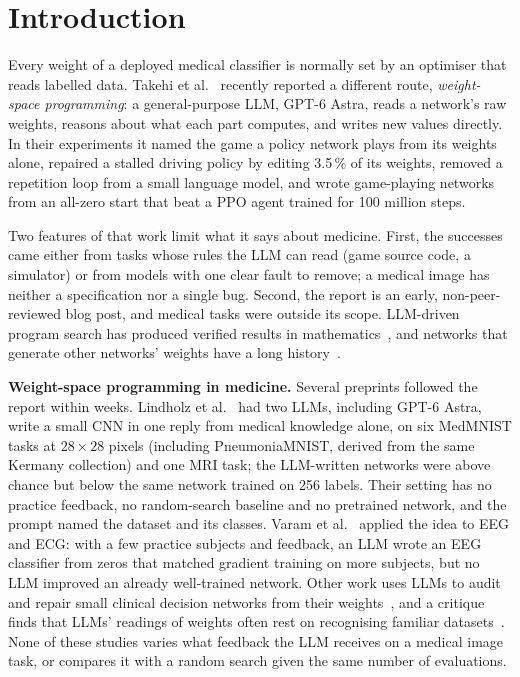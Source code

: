 \documentclass[runningheads]{llncs}
\newcommand{\Astra}{GPT-6 Astra}
\begin{document}
\section{Introduction}
Every weight of a deployed medical classifier is normally set by an optimiser that reads labelled data.
Takehi et al.~\cite{takehi2026} recently reported a different route, \emph{weight-space programming}: a general-purpose LLM, \Astra, reads a network's raw weights, reasons about what each part computes, and writes new values directly.
In their experiments it named the game a policy network plays from its weights alone, repaired a stalled driving policy by editing 3.5\,\% of its weights, removed a repetition loop from a small language model, and wrote game-playing networks from an all-zero start that beat a PPO agent trained for 100 million steps.

Two features of that work limit what it says about medicine.
First, the successes came either from tasks whose rules the LLM can read (game source code, a simulator) or from models with one clear fault to remove; a medical image has neither a specification nor a single bug.
Second, the report is an early, non-peer-reviewed blog post, and medical tasks were outside its scope.
LLM-driven program search has produced verified results in mathematics~\cite{romeraparedes2024}, and networks that generate other networks' weights have a long history~\cite{ha2017}.

\noindent\textbf{Weight-space programming in medicine.}
Several preprints followed the report within weeks.
Lindholz et al.~\cite{lindholz2026} had two LLMs, including \Astra, write a small CNN in one reply from medical knowledge alone, on six MedMNIST tasks at $28\times28$ pixels (including PneumoniaMNIST, derived from the same Kermany collection) and one MRI task; the LLM-written networks were above chance but below the same network trained on 256 labels.
Their setting has no practice feedback, no random-search baseline and no pretrained network, and the prompt named the dataset and its classes.
Varam et al.~\cite{varam2026} applied the idea to EEG and ECG: with a few practice subjects and feedback, an LLM wrote an EEG classifier from zeros that matched gradient training on more subjects, but no LLM improved an already well-trained network.
Other work uses LLMs to audit and repair small clinical decision networks from their weights~\cite{nusrat2026,liu2026}, and a critique finds that LLMs' readings of weights often rest on recognising familiar datasets~\cite{ahmed2026}.
None of these studies varies what feedback the LLM receives on a medical image task, or compares it with a random search given the same number of evaluations.
\end{document}
